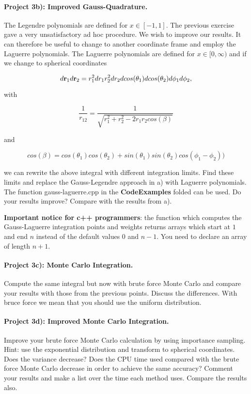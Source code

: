 \documentclass[%
oneside,                 %
final,                   %
10pt]{article}
\begin{document}
\paragraph{Project  3b): Improved Gauss-Quadrature.}
The Legendre polynomials are defined for $x\in [-1,1]$. The previous
exercise gave a very unsatisfactory ad hoc procedure. We wish to
improve our results. It can therefore be useful to change to another
coordinate frame and employ the Laguerre polynomials. The Laguerre
polynomials are defined for $x\in [0,\infty)$ and if we change to
spherical coordinates

\[
   d{\bf r}_1d{\bf r}_2  = r_1^2dr_1 r_2^2dr_2 dcos(\theta_1)dcos(\theta_2)d\phi_1d\phi_2,
\]

with

\[
   \frac{1}{r_{12}}= \frac{1}{\sqrt{r_1^2+r_2^2-2r_1r_2cos(\beta)}}
\]

and 

\[
cos(\beta) = cos(\theta_1)cos(\theta_2)+sin(\theta_1)sin(\theta_2)cos(\phi_1-\phi_2))
\]

we can rewrite the above integral with different integration
limits. Find these limits and replace the Gauss-Legendre approach in
a) with Laguerre polynomials.  The function gauss-laguerre.cpp in the \textbf{CodeExamples} folded can be
used.  Do your results
improve? Compare with the results from a).

\textbf{Important notice for c++ programmers}: the function which computes the Gauss-Laguerre integration points and weights returns arrays which start at $1$ and end $n$ instead of the default values $0$ and $n-1$. You need to declare an array of length $n+1$. 

\paragraph{Project  3c): Monte Carlo Integration.}
Compute the same integral but now with brute force Monte Carlo
and compare your results with those from the previous points. Discuss the differences.
With bruce force we mean that you should use the uniform distribution.

\paragraph{Project  3d): Improved Monte Carlo Integration.}
Improve your brute force Monte Carlo calculation by using importance sampling.
Hint: use the exponential distribution and transform to spherical coordinates.
Does the variance decrease? Does the CPU time used compared with the brute force 
Monte Carlo decrease in order to achieve the same accuracy? Comment your results
and make a list over the time each method uses. Compare the results also.
\end{document}
